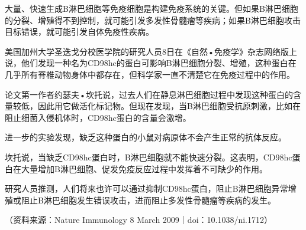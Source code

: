 大量、快速生成B淋巴细胞等免疫细胞是构建免疫系统的关键。但如果B淋巴细胞的分裂、增殖得不到控制，就可能引发多发性骨髓瘤等疾病；如果B淋巴细胞攻击目标错误，就可能引发自体免疫性疾病。

美国加州大学圣迭戈分校医学院的研究人员8日在《自然•免疫学》杂志网络版上说，他们发现一种名为CD98hc的蛋白可影响B淋巴细胞分裂、增殖，这种蛋白在几乎所有脊椎动物身体中都存在，但科学家一直不清楚它在免疫过程中的作用。

论文第一作者约瑟夫•坎托说，过去人们在静息淋巴细胞过程中发现这种蛋白的含量较低，因此用它做活化标记物。但现在发现，当B淋巴细胞受抗原刺激，比如在阻止细菌入侵机体时，CD98hc蛋白的含量会激增。

进一步的实验发现，缺乏这种蛋白的小鼠对病原体不会产生正常的抗体反应。

坎托说，当缺乏CD98hc蛋白时，B淋巴细胞就不能快速分裂。这表明，CD98hc蛋白在大量增加B淋巴细胞、促发免疫反应过程中发挥着不可缺少的作用。

研究人员推测，人们将来也许可以通过抑制CD98hc蛋白，阻止B淋巴细胞异常增殖或阻止B淋巴细胞发生错误攻击，进而阻止多发性骨髓瘤等疾病的发生。

（资料来源：Nature Immunology 8 March 2009｜doi：10.1038/ni.1712）

